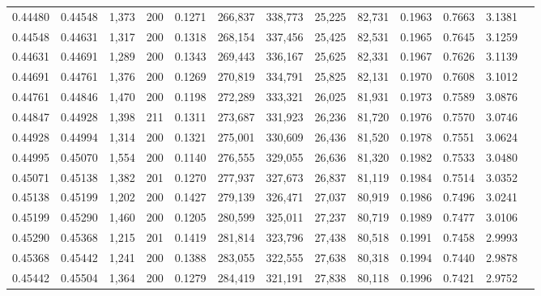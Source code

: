 \begin{tabular}{rrrrrrrrrrrrr}
0.44480 & 0.44548 & 1,373 & 200 &                                     0.1271 & 266,837 & 338,773 &  25,225 &  82,731 & 0.1963 & 0.7663 & 3.1381 \\
0.44548 & 0.44631 & 1,317 & 200 &                                     0.1318 & 268,154 & 337,456 &  25,425 &  82,531 & 0.1965 & 0.7645 & 3.1259 \\
0.44631 & 0.44691 & 1,289 & 200 &                                     0.1343 & 269,443 & 336,167 &  25,625 &  82,331 & 0.1967 & 0.7626 & 3.1139 \\
0.44691 & 0.44761 & 1,376 & 200 &                                     0.1269 & 270,819 & 334,791 &  25,825 &  82,131 & 0.1970 & 0.7608 & 3.1012 \\
0.44761 & 0.44846 & 1,470 & 200 &                                     0.1198 & 272,289 & 333,321 &  26,025 &  81,931 & 0.1973 & 0.7589 & 3.0876 \\
0.44847 & 0.44928 & 1,398 & 211 &                                     0.1311 & 273,687 & 331,923 &  26,236 &  81,720 & 0.1976 & 0.7570 & 3.0746 \\
0.44928 & 0.44994 & 1,314 & 200 &                                     0.1321 & 275,001 & 330,609 &  26,436 &  81,520 & 0.1978 & 0.7551 & 3.0624 \\
0.44995 & 0.45070 & 1,554 & 200 &                                     0.1140 & 276,555 & 329,055 &  26,636 &  81,320 & 0.1982 & 0.7533 & 3.0480 \\
0.45071 & 0.45138 & 1,382 & 201 &                                     0.1270 & 277,937 & 327,673 &  26,837 &  81,119 & 0.1984 & 0.7514 & 3.0352 \\
0.45138 & 0.45199 & 1,202 & 200 &                                     0.1427 & 279,139 & 326,471 &  27,037 &  80,919 & 0.1986 & 0.7496 & 3.0241 \\
0.45199 & 0.45290 & 1,460 & 200 &                                     0.1205 & 280,599 & 325,011 &  27,237 &  80,719 & 0.1989 & 0.7477 & 3.0106 \\
0.45290 & 0.45368 & 1,215 & 201 &                                     0.1419 & 281,814 & 323,796 &  27,438 &  80,518 & 0.1991 & 0.7458 & 2.9993 \\
0.45368 & 0.45442 & 1,241 & 200 &                                     0.1388 & 283,055 & 322,555 &  27,638 &  80,318 & 0.1994 & 0.7440 & 2.9878 \\
0.45442 & 0.45504 & 1,364 & 200 &                                     0.1279 & 284,419 & 321,191 &  27,838 &  80,118 & 0.1996 & 0.7421 & 2.9752 \\

\end{tabular}
